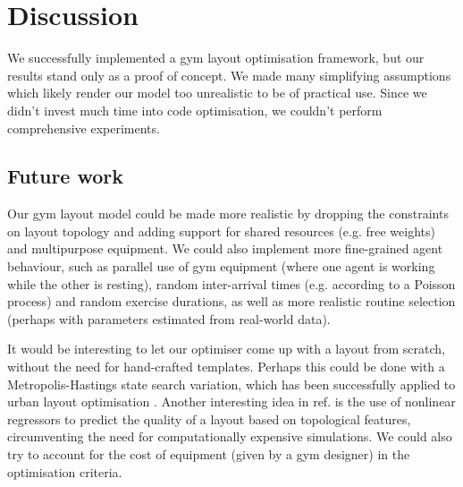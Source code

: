 \documentclass[9pt]{pnas-new}
\begin{document}
\section*{Discussion}

We successfully implemented a gym layout optimisation framework, but our results stand only as a proof of concept.
We made many simplifying assumptions which likely render our model too unrealistic to be of practical use.
Since we didn't invest much time into code optimisation, we couldn't perform comprehensive experiments.
 
\subsection*{Future work} 

Our gym layout model could be made more realistic by dropping the constraints on layout topology and adding support for shared resources (e.g. free weights) and multipurpose equipment.
We could also implement more fine-grained agent behaviour, such as parallel use of gym equipment (where one agent is working while the other is resting), random inter-arrival times (e.g. according to a Poisson process) and random exercise durations,
as well as more realistic routine selection (perhaps with parameters estimated from real-world data).

It would be interesting to let our optimiser come up with a layout from scratch, without the need for hand-crafted templates.
Perhaps this could be done with a Metropolis-Hastings state search variation, which has been successfully applied to urban layout optimisation \cite{feng2016crowd_drive_layout_design,mathew2019urban_walkability}.
Another interesting idea in ref. \cite{feng2016crowd_drive_layout_design} is the use of nonlinear regressors to predict the quality of a layout based on topological features, circumventing the need for computationally expensive simulations.
We could also try to account for the cost of equipment (given by a gym designer) in the optimisation criteria.



\showacknow %


\begin{multicols}{2}
\section*{\bibname}

\end{multicols}
\end{document}

